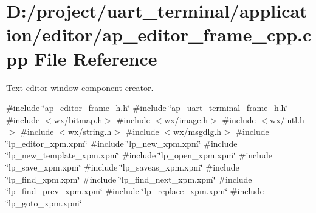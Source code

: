 \section{D\+:/project/uart\+\_\+terminal/application/editor/ap\+\_\+editor\+\_\+frame\+\_\+cpp.cpp File Reference}
\label{ap__editor__frame__cpp_8cpp}


Text editor window component creator.  


{\ttfamily \#include \char`\"{}ap\+\_\+editor\+\_\+frame\+\_\+h.\+h\char`\"{}}\newline
{\ttfamily \#include \char`\"{}ap\+\_\+uart\+\_\+terminal\+\_\+frame\+\_\+h.\+h\char`\"{}}\newline
{\ttfamily \#include $<$wx/bitmap.\+h$>$}\newline
{\ttfamily \#include $<$wx/image.\+h$>$}\newline
{\ttfamily \#include $<$wx/intl.\+h$>$}\newline
{\ttfamily \#include $<$wx/string.\+h$>$}\newline
{\ttfamily \#include $<$wx/msgdlg.\+h$>$}\newline
{\ttfamily \#include \char`\"{}lp\+\_\+editor\+\_\+xpm.\+xpm\char`\"{}}\newline
{\ttfamily \#include \char`\"{}lp\+\_\+new\+\_\+xpm.\+xpm\char`\"{}}\newline
{\ttfamily \#include \char`\"{}lp\+\_\+new\+\_\+template\+\_\+xpm.\+xpm\char`\"{}}\newline
{\ttfamily \#include \char`\"{}lp\+\_\+open\+\_\+xpm.\+xpm\char`\"{}}\newline
{\ttfamily \#include \char`\"{}lp\+\_\+save\+\_\+xpm.\+xpm\char`\"{}}\newline
{\ttfamily \#include \char`\"{}lp\+\_\+saveas\+\_\+xpm.\+xpm\char`\"{}}\newline
{\ttfamily \#include \char`\"{}lp\+\_\+find\+\_\+xpm.\+xpm\char`\"{}}\newline
{\ttfamily \#include \char`\"{}lp\+\_\+find\+\_\+next\+\_\+xpm.\+xpm\char`\"{}}\newline
{\ttfamily \#include \char`\"{}lp\+\_\+find\+\_\+prev\+\_\+xpm.\+xpm\char`\"{}}\newline
{\ttfamily \#include \char`\"{}lp\+\_\+replace\+\_\+xpm.\+xpm\char`\"{}}\newline
{\ttfamily \#include \char`\"{}lp\+\_\+goto\+\_\+xpm.\+xpm\char`\"{}}\newline
